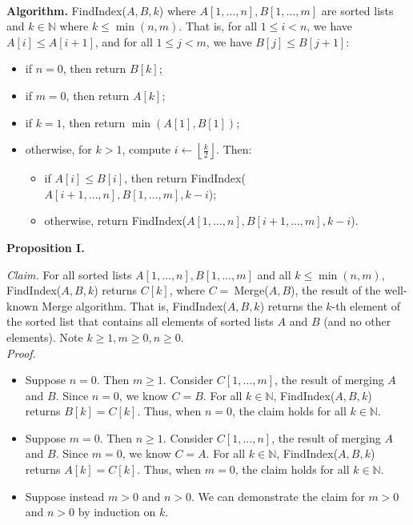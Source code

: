\begin{solution}\\

\noindent\textbf{Algorithm. }{\sc FindIndex}($A,B,k$) where $A[1,\dots,n],B[1,\dots,m]$ are sorted lists and $k\in\mathbb{N}$ where $k\leq\min(n,m)$. That is, for all $1\leq i<n$, we have $A[i]\leq A[i+1]$, and for all $1\leq j<m$, we have $B[j]\leq B[j+1]$:
\begin{itemize}
\item if $n=0$, then return $B[k]$;
\item if $m=0$, then return $A[k]$;
\item if $k=1$, then return $\min(A[1],B[1])$;
\item otherwise, for $k>1$, compute $i\leftarrow\left\lfloor\frac{k}{2}\right\rfloor$. Then:
\begin{itemize}
\item if $A[i]\leq B[i]$, then return {\sc FindIndex}($A[i+1,\dots,n],B[1,\dots,m],k-i$);
\item otherwise, return {\sc FindIndex}($A[1,\dots,n],B[i+1,\dots,m],k-i$).
\end{itemize}
\end{itemize}

\noindent\textbf{Proposition I.}

\noindent\textit{Claim. }For all sorted lists $A[1,\dots,n],B[1,\dots,m]$ and all $k\leq\min(n,m)$, {\sc FindIndex}($A,B,k$) returns $C[k]$, where $C=~${\sc Merge}($A,B$), the result of the well-known {\sc Merge} algorithm. That is, {\sc FindIndex}($A,B,k$) returns the $k$-th element of the sorted list that contains all elements of sorted lists $A$ and $B$ (and no other elements). Note $k\geq 1,m\geq 0,n\geq 0$.\\

\noindent\textit{Proof.}
\begin{itemize}
\item Suppose $n=0$. Then $m\geq 1$. Consider $C[1,\dots,m]$, the result of merging $A$ and $B$. Since $n=0$, we know $C=B$. For all $k\in\mathbb{N}$, {\sc FindIndex}($A,B,k$) returns $B[k]=C[k]$. Thus, when $n=0$, the claim holds for all $k\in\mathbb{N}$.
\item Suppose $m=0$. Then $n\geq 1$. Consider $C[1,\dots,n]$, the result of merging $A$ and $B$. Since $m=0$, we know $C=A$. For all $k\in\mathbb{N}$, {\sc FindIndex}($A,B,k$) returns $A[k]=C[k]$. Thus, when $m=0$, the claim holds for all $k\in\mathbb{N}$.
\item Suppose instead $m>0$ and $n>0$. We can demonstrate the claim for $m>0$ and $n>0$ by induction on $k$.\\


\end{itemize}
\end{solution}
